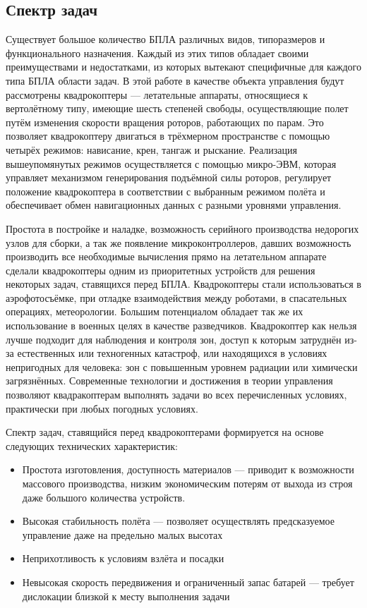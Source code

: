 \documentclass[a4paper, 14pt]{extarticle}
\let\Oldsubsection\subsection
\renewcommand{\subsection}{\FloatBarrier\Oldsubsection}
\begin{document}
\subsection{Спектр задач}
Существует большое количество БПЛА
различных видов, типоразмеров и функционального назначения. Каждый из этих типов обладает своими преимуществами и недостатками, из которых вытекают специфичные для каждого типа БПЛА области задач. В этой работе в качестве объекта управления будут рассмотрены квадрокоптеры — летательные аппараты, относящиеся к вертолётному типу, имеющие шесть степеней свободы,
осуществляющие полет путём изменения скорости вращения роторов,
работающих по парам. Это позволяет квадрокоптеру двигаться в трёхмерном
пространстве с помощью четырёх режимов: нависание, крен, тангаж и
рыскание. Реализация вышеупомянутых режимов осуществляется с помощью
микро-ЭВМ, которая управляет механизмом генерирования подъёмной силы роторов, регулирует положение квадрокоптера в соответствии с выбранным режимом полёта и обеспечивает обмен навигационных данных с разными
уровнями управления.  \par 
Простота в постройке и наладке, возможность серийного производства недорогих узлов для сборки, а так же появление микроконтроллеров, давших возможность производить все необходимые вычисления прямо на летательном аппарате сделали квадрокоптеры одним из приоритетных устройств для решения некоторых задач, ставящихся перед БПЛА. Квадрокоптеры стали использоваться в аэрофотосъёмке, при отладке взаимодействия между роботами, в спасательных операциях, метеорологии. Большим потенциалом обладает так же их использование в военных целях в качестве разведчиков. Квадрокоптер как нельзя лучше подходит для наблюдения и контроля зон, доступ к которым затруднён из-за естественных или техногенных катастроф, или находящихся в условиях непригодных для человека: зон с повышенным уровнем радиации или химически загрязнённых. Современные технологии и достижения в теории управления позволяют квадракоптерам выполнять задачи во всех перечисленных условиях, практически при любых погодных условиях. \par
Спектр задач, ставящийся перед квадрокоптерами формируется на основе следующих технических характеристик:
\begin{itemize}
	\item Простота изготовления, доступность материалов — приводит к возможности массового производства, низким экономическим потерям от выхода из строя даже большого количества устройств.
	\item Высокая стабильность полёта — позволяет осуществлять предсказуемое управление даже на предельно малых высотах
	\item Неприхотливость к условиям взлёта и посадки
	\item Невысокая скорость передвижения и ограниченный запас батарей — требует дислокации близкой к месту выполнения задачи
\end{itemize}
\end{document}
